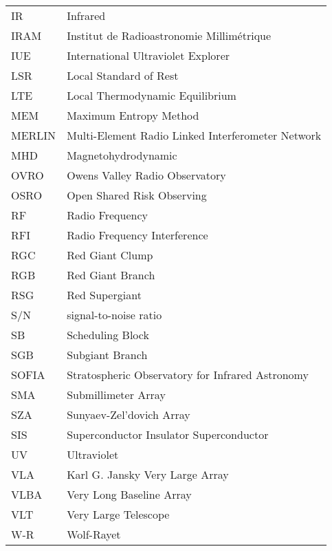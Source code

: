 \begin{center}
\begin{longtable}{ll}
IR & Infrared \\
IRAM & Institut de Radioastronomie Millim\'etrique \\
IUE & International Ultraviolet Explorer \\
LSR & Local Standard of Rest \\
LTE & Local Thermodynamic Equilibrium \\
MEM & Maximum Entropy Method\\
MERLIN & Multi-Element Radio Linked Interferometer Network\\
MHD & Magnetohydrodynamic \\
OVRO & Owens Valley Radio Observatory \\
OSRO & Open Shared Risk Observing \\
RF & Radio Frequency \\
RFI & Radio Frequency Interference \\
RGC & Red Giant Clump \\
RGB & Red Giant Branch \\
RSG & Red Supergiant \\
S/N & signal-to-noise ratio\\
SB & Scheduling Block \\
SGB & Subgiant Branch \\
SOFIA & Stratospheric Observatory for Infrared Astronomy\\
SMA & Submillimeter Array \\
SZA & Sunyaev-Zel'dovich Array \\
SIS & Superconductor Insulator Superconductor \\
UV & Ultraviolet \\
VLA & Karl G. Jansky Very Large Array \\
VLBA & Very Long Baseline Array \\
VLT & Very Large Telescope \\
W-R & Wolf-Rayet\\
\end{longtable}
\end{center}

